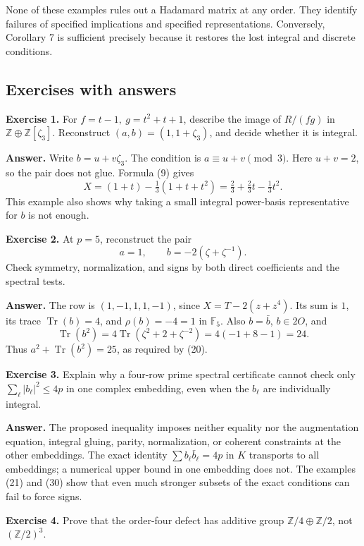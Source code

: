\documentclass[
  11pt,
]{article}
\begin{document}
None of these examples rules out a Hadamard matrix at any order. They
identify failures of specified implications and specified
representations. Conversely, Corollary 7 is sufficient precisely because
it restores the lost integral and discrete conditions.

\subsection{Exercises with answers}\label{exercises-with-answers}

\textbf{Exercise 1.} For \(f=t-1,\ g=t^2+t+1\), describe the image of
\(R/(fg)\) in \(\mathbb Z\oplus\mathbb Z[\zeta_3]\). Reconstruct
\((a,b)=(1,1+\zeta_3)\), and decide whether it is integral.

\textbf{Answer.} Write \(b=u+v\zeta_3\). The condition is
\(a\equiv u+v\pmod3\). Here \(u+v=2\), so the pair does not glue.
Formula (9) gives \[
 X=(1+t)-\tfrac13(1+t+t^2)
   =\tfrac23+\tfrac23t-\tfrac13t^2.
 \] This example also shows why taking a small integral power-basis
representative for \(b\) is not enough.

\textbf{Exercise 2.} At \(p=5\), reconstruct the pair \[
 a=1,\qquad b=-2(\zeta+\zeta^{-1}).
 \] Check symmetry, normalization, and signs by both direct coefficients
and the spectral tests.

\textbf{Answer.} The row is \((1,-1,1,1,-1)\), since \(X=T-2(z+z^4)\).
Its sum is \(1\), its trace \(\operatorname{Tr}(b)=4\), and
\(\rho(b)=-4=1\) in \(\mathbb F_5\). Also \(b=\bar b\), \(b\in2O\), and
\[
 \operatorname{Tr}(b^2)
 =4\operatorname{Tr}(\zeta^2+2+\zeta^{-2})
 =4(-1+8-1)=24.
 \] Thus \(a^2+\operatorname{Tr}(b^2)=25\), as required by (20).

\textbf{Exercise 3.} Explain why a four-row prime spectral certificate
cannot check only \(\sum_\ell|b_\ell|^2\le4p\) in one complex embedding,
even when the \(b_\ell\) are individually integral.

\textbf{Answer.} The proposed inequality imposes neither equality nor
the augmentation equation, integral gluing, parity, normalization, or
coherent constraints at the other embeddings. The exact identity
\(\sum b_\ell\bar b_\ell=4p\) in \(K\) transports to all embeddings; a
numerical upper bound in one embedding does not. The examples (21) and
(30) show that even much stronger subsets of the exact conditions can
fail to force signs.

\textbf{Exercise 4.} Prove that the order-four defect has additive group
\(\mathbb Z/4\oplus\mathbb Z/2\), not \((\mathbb Z/2)^3\).
\end{document}
